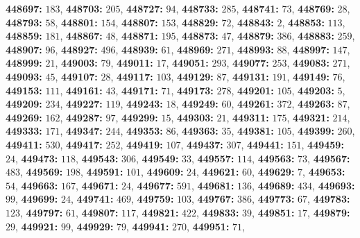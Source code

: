 \textsf{\bfseries 448697:} $183$, \textsf{\bfseries 448703:} $205$, \textsf{\bfseries 448727:} $94$, \textsf{\bfseries 448733:} $285$, \textsf{\bfseries 448741:} $73$, \textsf{\bfseries 448769:} $28$, \textsf{\bfseries 448793:} $58$, \textsf{\bfseries 448801:} $154$, \textsf{\bfseries 448807:} $153$, \textsf{\bfseries 448829:} $72$, \textsf{\bfseries 448843:} $2$, \textsf{\bfseries 448853:} $113$, \textsf{\bfseries 448859:} $181$, \textsf{\bfseries 448867:} $48$, \textsf{\bfseries 448871:} $195$, \textsf{\bfseries 448873:} $47$, \textsf{\bfseries 448879:} $386$, \textsf{\bfseries 448883:} $259$, \textsf{\bfseries 448907:} $96$, \textsf{\bfseries 448927:} $496$, \textsf{\bfseries 448939:} $61$, \textsf{\bfseries 448969:} $271$, \textsf{\bfseries 448993:} $88$, \textsf{\bfseries 448997:} $147$, \textsf{\bfseries 448999:} $21$, \textsf{\bfseries 449003:} $79$, \textsf{\bfseries 449011:} $17$, \textsf{\bfseries 449051:} $293$, \textsf{\bfseries 449077:} $253$, \textsf{\bfseries 449083:} $271$, \textsf{\bfseries 449093:} $45$, \textsf{\bfseries 449107:} $28$, \textsf{\bfseries 449117:} $103$, \textsf{\bfseries 449129:} $87$, \textsf{\bfseries 449131:} $191$, \textsf{\bfseries 449149:} $76$, \textsf{\bfseries 449153:} $111$, \textsf{\bfseries 449161:} $43$, \textsf{\bfseries 449171:} $71$, \textsf{\bfseries 449173:} $278$, \textsf{\bfseries 449201:} $105$, \textsf{\bfseries 449203:} $5$, \textsf{\bfseries 449209:} $234$, \textsf{\bfseries 449227:} $119$, \textsf{\bfseries 449243:} $18$, \textsf{\bfseries 449249:} $60$, \textsf{\bfseries 449261:} $372$, \textsf{\bfseries 449263:} $87$, \textsf{\bfseries 449269:} $162$, \textsf{\bfseries 449287:} $97$, \textsf{\bfseries 449299:} $15$, \textsf{\bfseries 449303:} $21$, \textsf{\bfseries 449311:} $175$, \textsf{\bfseries 449321:} $214$, \textsf{\bfseries 449333:} $171$, \textsf{\bfseries 449347:} $244$, \textsf{\bfseries 449353:} $86$, \textsf{\bfseries 449363:} $35$, \textsf{\bfseries 449381:} $105$, \textsf{\bfseries 449399:} $260$, \textsf{\bfseries 449411:} $530$, \textsf{\bfseries 449417:} $252$, \textsf{\bfseries 449419:} $107$, \textsf{\bfseries 449437:} $307$, \textsf{\bfseries 449441:} $151$, \textsf{\bfseries 449459:} $24$, \textsf{\bfseries 449473:} $118$, \textsf{\bfseries 449543:} $306$, \textsf{\bfseries 449549:} $33$, \textsf{\bfseries 449557:} $114$, \textsf{\bfseries 449563:} $73$, \textsf{\bfseries 449567:} $483$, \textsf{\bfseries 449569:} $198$, \textsf{\bfseries 449591:} $101$, \textsf{\bfseries 449609:} $24$, \textsf{\bfseries 449621:} $60$, \textsf{\bfseries 449629:} $7$, \textsf{\bfseries 449653:} $54$, \textsf{\bfseries 449663:} $167$, \textsf{\bfseries 449671:} $24$, \textsf{\bfseries 449677:} $591$, \textsf{\bfseries 449681:} $136$, \textsf{\bfseries 449689:} $434$, \textsf{\bfseries 449693:} $99$, \textsf{\bfseries 449699:} $24$, \textsf{\bfseries 449741:} $469$, \textsf{\bfseries 449759:} $103$, \textsf{\bfseries 449767:} $386$, \textsf{\bfseries 449773:} $67$, \textsf{\bfseries 449783:} $123$, \textsf{\bfseries 449797:} $61$, \textsf{\bfseries 449807:} $117$, \textsf{\bfseries 449821:} $422$, \textsf{\bfseries 449833:} $39$, \textsf{\bfseries 449851:} $17$, \textsf{\bfseries 449879:} $29$, \textsf{\bfseries 449921:} $99$, \textsf{\bfseries 449929:} $79$, \textsf{\bfseries 449941:} $270$, \textsf{\bfseries 449951:} $71$, 
